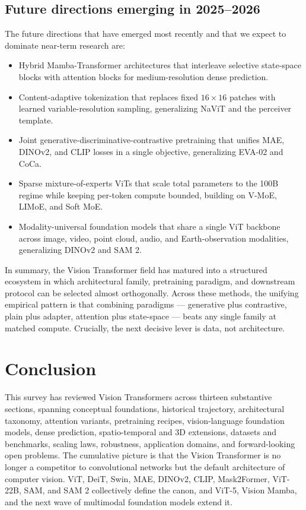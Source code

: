 \documentclass{article}
\begin{document}
\subsection{Future directions emerging in 2025--2026}\label{future-directions-emerging-in-20252026}

The future directions that have emerged most recently and that we expect to dominate near-term research are:

\begin{itemize}

\item
  Hybrid Mamba-Transformer architectures that interleave selective state-space blocks with attention blocks for medium-resolution dense prediction.
\item
  Content-adaptive tokenization that replaces fixed \(16 \times 16\) patches with learned variable-resolution sampling, generalizing NaViT and the perceiver template.
\item
  Joint generative-discriminative-contrastive pretraining that unifies MAE, DINOv2, and CLIP losses in a single objective, generalizing EVA-02 and CoCa.
\item
  Sparse mixture-of-experts ViTs that scale total parameters to the 100B regime while keeping per-token compute bounded, building on V-MoE, LIMoE, and Soft MoE.
\item
  Modality-universal foundation models that share a single ViT backbone across image, video, point cloud, audio, and Earth-observation modalities, generalizing DINOv2 and SAM 2.
\end{itemize}

In summary, the Vision Transformer field has matured into a structured ecosystem in which architectural family, pretraining paradigm, and downstream protocol can be selected almost orthogonally. Across these methods, the unifying empirical pattern is that combining paradigms --- generative plus contrastive, plain plus adapter, attention plus state-space --- beats any single family at matched compute. Crucially, the next decisive lever is data, not architecture.

\section{Conclusion}\label{conclusion}

This survey has reviewed Vision Transformers across thirteen substantive sections, spanning conceptual foundations, historical trajectory, architectural taxonomy, attention variants, pretraining recipes, vision-language foundation models, dense prediction, spatio-temporal and 3D extensions, datasets and benchmarks, scaling laws, robustness, application domains, and forward-looking open problems. The cumulative picture is that the Vision Transformer is no longer a competitor to convolutional networks but the default architecture of computer vision. ViT, DeiT, Swin, MAE, DINOv2, CLIP, Mask2Former, ViT-22B, SAM, and SAM 2 collectively define the canon, and ViT-5, Vision Mamba, and the next wave of multimodal foundation models extend it.
\end{document}
